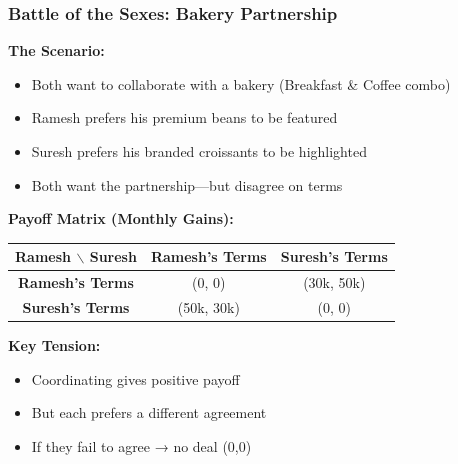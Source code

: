 \begin{frame}[fragile]\frametitle{Battle of the Sexes: Bakery Partnership}

\textbf{The Scenario:}
\begin{itemize}
  \item Both want to collaborate with a bakery (Breakfast \& Coffee combo)
  \item Ramesh prefers his premium beans to be featured
  \item Suresh prefers his branded croissants to be highlighted
  \item Both want the partnership—but disagree on terms
\end{itemize}

\vspace{6pt}

\textbf{Payoff Matrix (Monthly Gains):}

\begin{center}
\begin{tabular}{|c|c|c|}
  \hline
  \textbf{Ramesh $\backslash$ Suresh} & \textbf{Ramesh's Terms} & \textbf{Suresh's Terms} \\
  \hline
  \textbf{Ramesh's Terms} & (0, 0) & (30k, 50k) \\
  \hline
  \textbf{Suresh's Terms} & (50k, 30k) & (0, 0) \\
  \hline
\end{tabular}
\end{center}

\vspace{6pt}

\textbf{Key Tension:}
\begin{itemize}
  \item Coordinating gives positive payoff
  \item But each prefers a different agreement
  \item If they fail to agree → no deal (0,0)
\end{itemize}

\end{frame}

